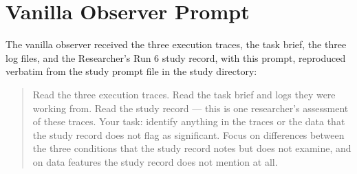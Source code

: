 \documentclass[11pt,a4paper]{article}
\begin{document}
\appendix

\section{Vanilla Observer Prompt}
\label{app:prompt}

The vanilla observer received the three execution traces, the task brief, the
three log files, and the Researcher's Run 6 study record, with this prompt,
reproduced verbatim from the study prompt file in the study directory:

\begin{quote}
Read the three execution traces. Read the task brief and logs they were
working from. Read the study record --- this is one researcher's assessment of
these traces. Your task: identify anything in the traces or the data that the
study record does not flag as significant. Focus on differences between the
three conditions that the study record notes but does not examine, and on data
features the study record does not mention at all.
\end{quote}
\end{document}
